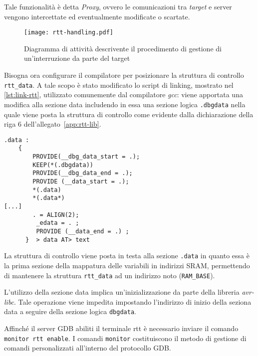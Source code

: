 Tale funzionalità è detta \textit{Proxy}, ovvero le comunicazioni tra \textit{target} e server vengono intercettate ed eventualmente modificate o scartate.

\begin{figure}[b]
    \centering
    \texttt{[image: rtt-handling.pdf]}
    \caption[]{Diagramma di attività descrivente il procedimento di gestione di un'interruzione da parte del target}\label{fig:rtt-gdbsrv}
\end{figure}

Bisogna ora configurare il compilatore per posizionare la struttura di controllo \texttt{rtt\_data}. A tale scopo è stato modificato lo script di linking, mostrato nel \cref{lst:link-rtt}, utilizzato comunemente dal compilatore \textit{gcc}: viene apportata una modifica alla sezione data includendo in essa una sezione logica \texttt{.dbgdata} nella quale viene posta la struttura di controllo come evidente dalla dichiarazione della riga 6 dell'allegato~\ref{app:rtt-lib}.

\noindent\begin{minipage}{\textwidth}
    \begin{lstlisting}[label=lst:link-rtt, caption={Sezione del linker script modificato per la compilazione della libraria rtt.}]
    .data : 
    {
        PROVIDE(__dbg_data_start = .);
        KEEP(*(.dbgdata))
        PROVIDE(__dbg_data_end = .);
        PROVIDE (__data_start = .);
        *(.data)
        *(.data*)
[...]
        . = ALIGN(2);
         _edata = . ;
         PROVIDE (__data_end = .) ;
      }  > data AT> text
    \end{lstlisting}
\end{minipage}

La struttura di controllo viene posta in testa alla sezione \texttt{.data} in quanto essa è la prima sezione della mappatura delle variabili in indirizzi SRAM, permettendo di mantenere la struttura \texttt{rtt\_data} ad un indirizzo noto (\mbox{\texttt{RAM\_BASE}}).

L'utilizzo della sezione data implica un'inizializzazione da parte della libreria \textit{avr-libc}. Tale operazione viene impedita impostando l'indirizzo di inizio della seziona data a seguire della sezione logica \texttt{dbgdata}. 

Affinché il server GDB abiliti il terminale rtt è necessario inviare il comando \texttt{monitor rtt enable}.
I comandi \texttt{monitor} costituiscono il metodo di gestione di comandi personalizzati all'interno del protocollo GDB.\@